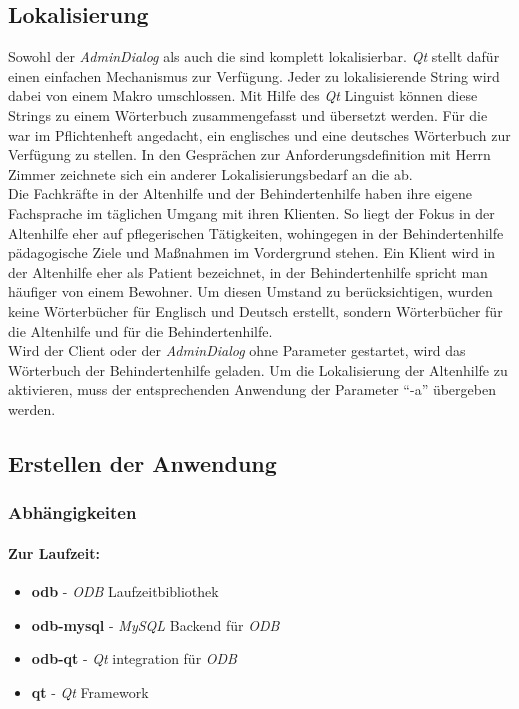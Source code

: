 \subsection{Lokalisierung}
Sowohl der \textit{AdminDialog} als auch die \EBP sind komplett lokalisierbar. \textit{Qt} stellt dafür einen einfachen Mechanismus zur Verfügung. Jeder zu
lokalisierende String wird dabei von einem Makro umschlossen. Mit Hilfe des \textit{Qt} Linguist können diese Strings zu einem Wörterbuch zusammengefasst und
übersetzt werden. Für die \EBP war im Pflichtenheft angedacht, ein englisches und eine deutsches Wörterbuch zur Verfügung zu stellen. In den
Gesprächen zur Anforderungsdefinition mit Herrn Zimmer zeichnete sich ein anderer Lokalisierungsbedarf an die \EBP ab.\\
Die Fachkräfte in der Altenhilfe und der Behindertenhilfe haben ihre eigene Fachsprache im täglichen Umgang mit ihren Klienten. So liegt der Fokus in
der Altenhilfe eher auf pflegerischen Tätigkeiten, wohingegen in der Behindertenhilfe pädagogische Ziele und Maßnahmen im Vordergrund stehen. Ein
Klient wird in der Altenhilfe eher als Patient bezeichnet, in der Behindertenhilfe spricht man häufiger von einem Bewohner. Um diesen Umstand zu
berücksichtigen, wurden keine Wörterbücher für Englisch und Deutsch erstellt, sondern Wörterbücher für die Altenhilfe und für die Behindertenhilfe.\\
Wird der Client oder der \textit{AdminDialog} ohne Parameter gestartet, wird das Wörterbuch der Behindertenhilfe geladen. Um die Lokalisierung der Altenhilfe
zu aktivieren, muss der entsprechenden Anwendung der Parameter ``-a'' übergeben werden.

\newpage

\subsection{Erstellen der Anwendung}
\subsubsection{Abhängigkeiten}
\paragraph{Zur Laufzeit:}
\begin{itemize}
	\item \textbf{odb} - \textit{ODB} Laufzeitbibliothek
	\item \textbf{odb-mysql} - \textit{MySQL} Backend für \textit{ODB}
	\item \textbf{odb-qt} - \textit{Qt} integration für \textit{ODB}
	\item \textbf{qt} - \textit{Qt} Framework
\end{itemize}
